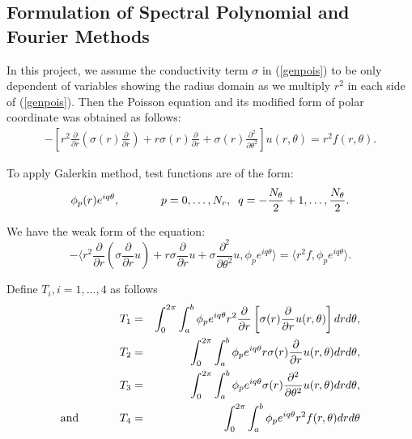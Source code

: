 \subsection{Formulation of Spectral Polynomial and Fourier Methods}

In this project, we assume the conductivity term $\sigma$ in (\ref{genpois}) to be only dependent of variables showing the radius domain as we multiply $r^2$ in each side of (\ref{genpois}). Then the Poisson equation and its modified form of polar coordinate was obtained as follows:
\begin{eqnarray}
-\left[r^2 \frac{\partial}{\partial r} (\sigma(r) \frac{\partial}{\partial r}) + r \sigma(r) \frac{\partial}{\partial r} + \sigma(r) \frac{\partial^2}{\partial \theta^2}\right] u(r, \theta) = r^2 f(r, \theta).
\end{eqnarray}

\vspace{0.1in}
To apply Galerkin method, test functions are of the form:
\begin{equation}
\phi_p(r) e^{iq\theta}, \hspace{.5in} p=0,\ldots,N_r, \;\; q = -\frac{N_\theta}{2}+1,\ldots,\frac{N_\theta}{2}.
\end{equation}

\vspace{0.1in}
We have the weak form of the equation:
\begin{equation}\label{galeqn}
-\langle  r^2 \frac{\partial}{\partial r} (\sigma \frac{\partial}{\partial r}u) + r \sigma \frac{\partial}{\partial r}u + \sigma \frac{\partial^2}{\partial \theta^2}u, \phi_p e^{iq\theta} \rangle = \langle r^2 f, \phi_p e^{iq\theta} \rangle.
\end{equation}

\vspace{0.1in} Define $T_i, i = 1,\ldots,4$ as follows
\begin{eqnarray}
T_1 &=& \int_{0}^{2\pi} \int_{a}^{b} \phi_p e^{iq\theta} r^2 \frac{\partial}{\partial r}\left[\sigma(r) \frac{\partial}{\partial r}u(r, \theta)\right] dr d\theta,\\
T_2 &=& \int_{0}^{2\pi} \int_{a}^{b} \phi_p e^{iq\theta} r \sigma(r) \frac{\partial}{\partial r}u(r, \theta) dr d\theta,\\
T_3 &=& \int_{0}^{2\pi} \int_{a}^{b} \phi_p e^{iq\theta} \sigma(r) \frac{\partial^2}{\partial \theta^2}u(r, \theta) dr d\theta,\\
\mbox{and} \hspace{.5in}T_4 &=& \int_{0}^{2\pi} \int_{a}^{b} \phi_p e^{iq\theta} r^2 f(r, \theta) dr d\theta
\end{eqnarray}

